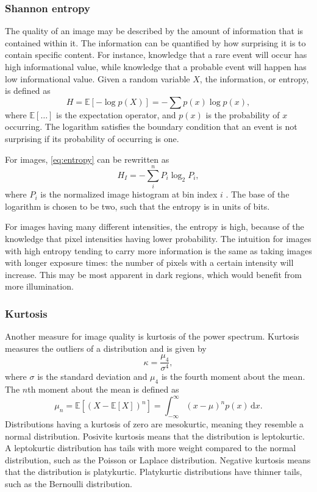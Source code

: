 \subsubsection{Shannon entropy}
The quality of an image may be described by the amount of information that is contained within it.
The information can be quantified by how surprising it is to contain specific content.
For instance, knowledge that a rare event will occur has high informational value, while knowledge that a probable event will happen has low informational value.
Given a random variable $X$, the information, or entropy, is defined as
\begin{equation}\label{eq:entropy}
    H = \mathbb{E}[-\log p(X)] = -\sum p(x) \log p(x),
\end{equation}
where $\mathbb{E}[\ldots]$ is the expectation operator, and $p(x)$ is the probability of $x$ occurring.
The logarithm satisfies the boundary condition that an event is not surprising if its probability of occurring is one.

For images, \cref{eq:entropy} can be rewritten as
\begin{equation}
    H_I = -\sum_{i}^n P_i \log_2 P_i,
\end{equation}
where $P_i$ is the normalized image histogram at bin index $i$ \cite{Koho2016}.
The base of the logarithm is chosen to be two, such that the entropy is in units of bits.

For images having many different intensities, the entropy is high, because of the knowledge that pixel intensities having lower probability.
The intuition for images with high entropy tending to carry more information is the same as taking images with longer exposure times:
the number of pixels with a certain intensity will increase.
This may be most apparent in dark regions, which would benefit from more illumination.

\subsubsection{Kurtosis}
Another measure for image quality is kurtosis of the power spectrum.
Kurtosis measures the outliers of a distribution and is given by
\begin{equation}
    \kappa = \frac{\mu_4}{\sigma^4},
\end{equation}
where $\sigma$ is the standard deviation and $\mu_4$ is the fourth moment about the mean.
The $n$th moment about the mean is defined as
\begin{equation}
    \mu_n = \mathbb{E}[(X-\mathbb{E}[X])^n] = \int_{-\infty}^\infty (x-\mu)^n p(x)\,\mathrm{d}x.
\end{equation}
Distributions having a kurtosis of zero are mesokurtic, meaning they resemble a normal distribution.
Posivite kurtosis means that the distribution is leptokurtic.
A leptokurtic distribution has tails with more weight compared to the normal distribution, such as the Poisson or Laplace distribution.
Negative kurtosis means that the distribution is platykurtic.
Platykurtic distributions have thinner tails, such as the Bernoulli distribution.

